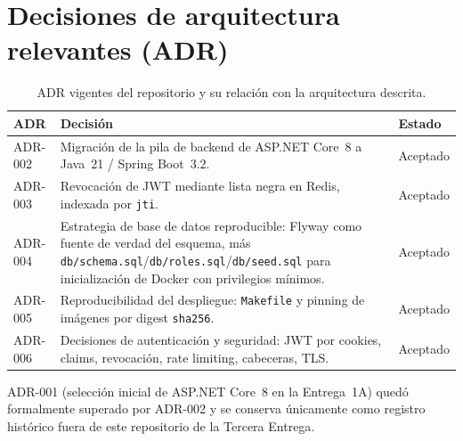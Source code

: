 \section{Decisiones de arquitectura relevantes (ADR)}
\label{sec:adr-relevantes}

\begin{table}[H]
  \centering
  \caption{ADR vigentes del repositorio y su relaci\'on con la arquitectura descrita.}
  \label{tab:adr-relevantes}
  \begin{tabular}{@{}p{2cm}p{9.5cm}p{2.5cm}@{}}
    \toprule
    ADR & Decisi\'on & Estado \\
    \midrule
    ADR-002 & Migraci\'on de la pila de backend de ASP.NET Core~8 a Java~21 / Spring Boot~3.2. & Aceptado \\
    ADR-003 & Revocaci\'on de JWT mediante lista negra en Redis, indexada por \texttt{jti}. & Aceptado \\
    ADR-004 & Estrategia de base de datos reproducible: Flyway como fuente de verdad del esquema, m\'as \texttt{db/schema.sql}/\texttt{db/roles.sql}/\texttt{db/seed.sql} para inicializaci\'on de Docker con privilegios m\'inimos. & Aceptado \\
    ADR-005 & Reproducibilidad del despliegue: \texttt{Makefile} y pinning de im\'agenes por digest \texttt{sha256}. & Aceptado \\
    ADR-006 & Decisiones de autenticaci\'on y seguridad: JWT por cookies, claims, revocaci\'on, rate limiting, cabeceras, TLS. & Aceptado \\
    \bottomrule
  \end{tabular}
\end{table}

ADR-001 (selecci\'on inicial de ASP.NET Core~8 en la Entrega~1A) qued\'o
formalmente superado por ADR-002 y se conserva \'unicamente como registro
hist\'orico fuera de este repositorio de la Tercera Entrega.
